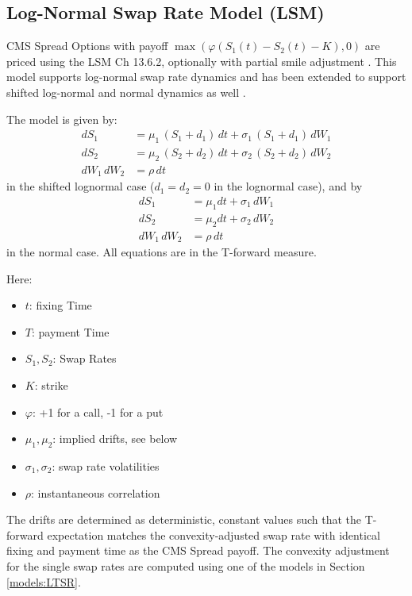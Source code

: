 \subsection{Log-Normal Swap Rate Model (LSM)}
\label{models:LSM}

CMS Spread Options with payoff $\max(\varphi(S_1(t)-S_2(t)-K),0)$ are priced using 
the LSM \cite{Brigo_Mercurio_2006} Ch 13.6.2, optionally with partial smile 
adjustment \cite{Berrahoui_2004}. This model supports log-normal swap rate dynamics 
and has been extended to support shifted log-normal and normal dynamics as well
\cite{Caspers_2015}. 

The model is given by:
\begin{align*}
dS_1 &= \mu_1 \,(S_1+d_1)\,dt+\sigma_1\, (S_1+d_1)\,dW_1 \\
dS_2 &= \mu_2 \,(S_2+d_2)\,dt+\sigma_2\, (S_2+d_2)\,dW_2 \\
dW_1 \,dW_2 & =\rho \,dt
\end{align*}
in the shifted lognormal case ($d_1=d_2=0$ in the lognormal case), and by
\begin{align*}
dS_1 &=\mu_1 dt + \sigma_1\, dW_1 \\
dS_2 &=\mu_2 dt +\sigma_2\, dW_2 \\
dW_1\,dW_2 &=\rho\,dt
\end{align*}
in the normal case. All equations are in the T-forward measure. 

Here:
\begin{itemize}
\item $t$: fixing Time
\item $T$: payment Time
\item $S_1,S_2$: Swap Rates
\item $K$: strike
\item $\varphi$: +1 for a call, -1 for a put
\item $\mu_1,\mu_2$: implied drifts, see below
\item $\sigma_1,\sigma_2$: swap rate volatilities
\item $\rho$: instantaneous correlation
\end{itemize}
The drifts are determined as deterministic, constant values such that the 
T-forward expectation matches the convexity-adjusted swap rate with identical 
fixing and payment time as the CMS Spread payoff.  The convexity adjustment 
for the single swap rates are computed using one of the models in Section 
\ref{models:LTSR}.

